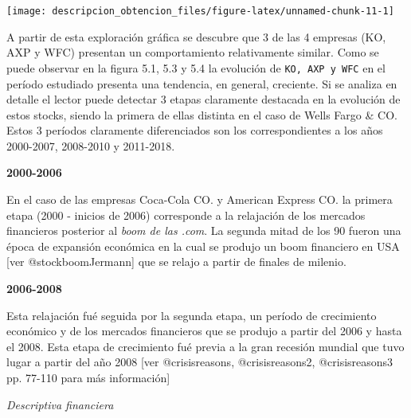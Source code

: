 \documentclass[]{article}
\newenvironment{Shaded}{\begin{snugshade}}{\end{snugshade}}
\newcommand{\DataTypeTok}[1]{\textcolor[rgb]{0.13,0.29,0.53}{#1}}
\newcommand{\KeywordTok}[1]{\textcolor[rgb]{0.13,0.29,0.53}{\textbf{#1}}}
\newcommand{\NormalTok}[1]{#1}
\newcommand{\OperatorTok}[1]{\textcolor[rgb]{0.81,0.36,0.00}{\textbf{#1}}}
\newcommand{\StringTok}[1]{\textcolor[rgb]{0.31,0.60,0.02}{#1}}
\begin{document}
\begin{Shaded}
\end{Shaded}

\begin{center}\texttt{[image: descripcion\_obtencion\_files/figure-latex/unnamed-chunk-11-1]} \end{center}
\centering

\setlength\parskip{5ex}
\justifying

A partir de esta exploración gráfica se descubre que 3 de las 4 empresas
(KO, AXP y WFC) presentan un comportamiento relativamente similar. Como
se puede observar en la figura 5.1, 5.3 y 5.4 la evolución de
\texttt{KO,\ AXP\ y\ WFC} en el período estudiado presenta una
tendencia, en general, creciente. Si se analiza en detalle el lector
puede detectar 3 etapas claramente destacada en la evolución de estos
stocks, siendo la primera de ellas distinta en el caso de Wells Fargo \&
CO. Estos 3 períodos claramente diferenciados son los correspondientes a
los años 2000-2007, 2008-2010 y 2011-2018.

\textbf{2000-2006}

En el caso de las empresas Coca-Cola CO. y American Express CO. la
primera etapa (2000 - inicios de 2006) corresponde a la relajación de
los mercados financieros posterior al \emph{boom de las .com}. La
segunda mitad de los 90 fueron una época de expansión económica en la
cual se produjo un boom financiero en USA {[}ver @stockboomJermann{]}
que se relajo a partir de finales de milenio.

\textbf{2006-2008}

Esta relajación fué seguida por la segunda etapa, un período de
crecimiento económico y de los mercados financieros que se produjo a
partir del 2006 y hasta el 2008. Esta etapa de crecimiento fué previa a
la gran recesión mundial que tuvo lugar a partir del año 2008 {[}ver
@crisisreasons, @crisisreasons2, @crisisreasons3 pp. 77-110 para más
información{]}

\setlength\parskip{5ex}
\justifying

\emph{Descriptiva financiera}
\end{document}
